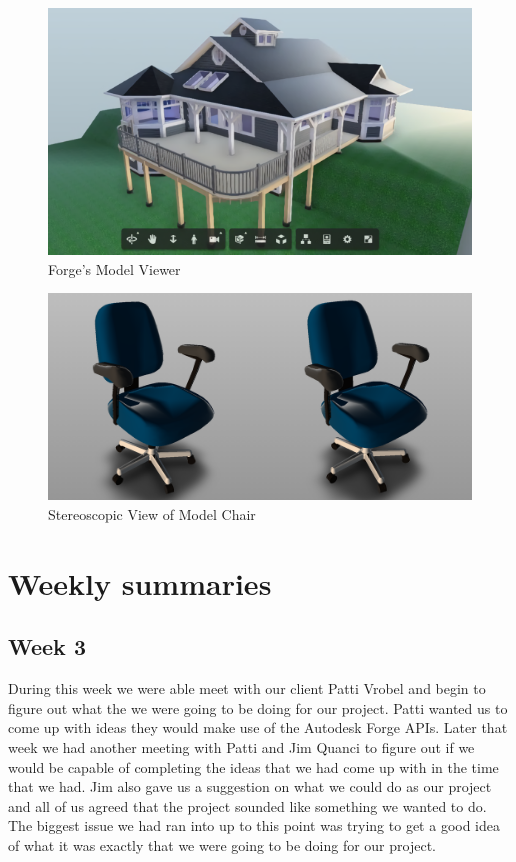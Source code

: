 \documentclass[10pt,draftclsnofoot,onecolumn]{IEEEtran}
\begin{document}
\newpage
\begin{figure}[ht]
	\includegraphics[scale=0.9]{modelviewer.png}
	\caption{Forge's Model Viewer}
\end{figure}
\begin{figure}[ht]
	\includegraphics[scale=0.3]{project.png}
	\caption{Stereoscopic View of Model Chair}
\end{figure}

\newpage

\section{Weekly summaries}
\subsection{Week 3}
During this week we were able meet with our client Patti Vrobel and begin to figure out what the we were going to be doing for our project. Patti wanted us to come up with ideas they would make use of the Autodesk Forge APIs. Later that week we had another meeting with Patti and Jim Quanci to figure out if we would be capable of completing the ideas that we had come up with in the time that we had. Jim also gave us a suggestion on what we could do as our project and all of us agreed that the project sounded like something we wanted to do. The biggest issue we had ran into up to this point was trying to get a good idea of what it was exactly that we were going to be doing for our project.   
\end{document}
